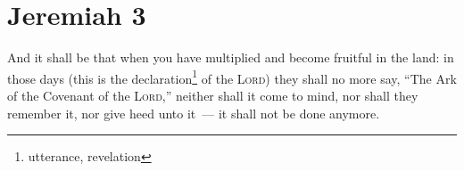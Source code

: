 \section{Jeremiah 3}\label{Jeremiah 3}
\begin{enumerate}[align=center]
     And it shall be that when you have multiplied and become fruitful in the land: in those days (this is the declaration\footnote{utterance, revelation} of the \textsc{Lord}) they shall no more say, ``The Ark of the Covenant of the \textsc{Lord},'' neither shall it come to mind, nor shall they remember it, nor give heed unto it~--- it shall not be done anymore.%
\end{enumerate}
